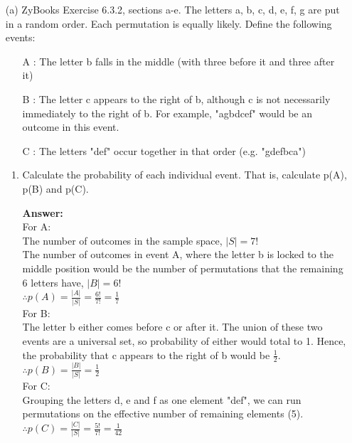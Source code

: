 \documentclass[14pt]{extreport}
\newcommand{\answer}[0]{\medskip \textbf{Answer:} \medskip}
\begin{document}
\begin{enumerate}[label=(\alph*)]
    
    \item[(a)] ZyBooks Exercise 6.3.2, sections a-e. The letters {a, b, c, d, e, f, g} are put in a random order. Each permutation is equally likely. Define the following events: 
    \begin{itemize}
        \item[A]: The letter b falls in the middle (with three before it and three after it)
        \item[B]: The letter c appears to the right of b, although c is not necessarily immediately to the right of b. For example, "agbdcef" would be an outcome in this event. 
        \item[C]: The letters "def" occur together in that order (e.g. "gdefbca")
    \end{itemize}
    
        \begin{enumerate}
            \item Calculate the probability of each individual event. That is, calculate p(A), p(B) and p(C). 
                
                \answer \\
                For A: \\
                The number of outcomes in the sample space, $|S| = 7!$\\
                The number of outcomes in event A, where the letter b is locked to the middle position would be the number of permutations that the remaining 6 letters have, $|B|=6!$\\
                $\therefore p(A) = \frac{|A|}{|S|} = \frac{6!}{7!} = \frac{1}{7}$\\
                
                For B:\\
                The letter b either comes before c or after it. The union of these two events are a universal set, so probability of either would total to 1. Hence, the probability that c appears to the right of b would be $\frac{1}{2}$. \\
                $\therefore p(B) = \frac{|B|}{|S|} = \frac{1}{2}$\\
                
                For C: \\
                Grouping the letters d, e and f as one element "def", we can run permutations on the effective number of remaining elements (5). \\
                $\therefore p(C) = \frac{|C|}{|S|} = \frac{5!}{7!} = \frac{1}{42}$\\
                

\end{enumerate}
\end{enumerate}
\end{document}
